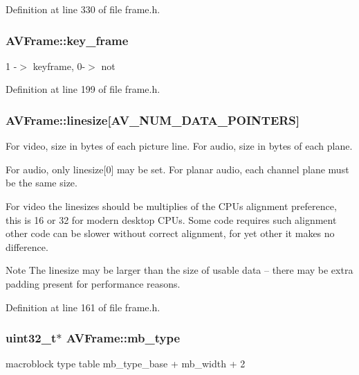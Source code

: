 Definition at line 330 of file frame.\+h.

\subsubsection[{\texorpdfstring{key\+\_\+frame}{key_frame}}]{ A\+V\+Frame\+::key\+\_\+frame}\hypertarget{struct_a_v_frame_a3649a81e8414a193d685a6eee06ce902}{}\label{struct_a_v_frame_a3649a81e8414a193d685a6eee06ce902}
1 -\/$>$ keyframe, 0-\/$>$ not 

Definition at line 199 of file frame.\+h.

\subsubsection[{\texorpdfstring{linesize}{linesize}}]{ A\+V\+Frame\+::linesize\mbox{[}{\bf A\+V\+\_\+\+N\+U\+M\+\_\+\+D\+A\+T\+A\+\_\+\+P\+O\+I\+N\+T\+E\+RS}\mbox{]}}\hypertarget{struct_a_v_frame_aa52bfc6605f6a3059a0c3226cc0f6567}{}\label{struct_a_v_frame_aa52bfc6605f6a3059a0c3226cc0f6567}
For video, size in bytes of each picture line. For audio, size in bytes of each plane.

For audio, only linesize\mbox{[}0\mbox{]} may be set. For planar audio, each channel plane must be the same size.

For video the linesizes should be multiplies of the C\+P\+Us alignment preference, this is 16 or 32 for modern desktop C\+P\+Us. Some code requires such alignment other code can be slower without correct alignment, for yet other it makes no difference.

\begin{DoxyNote}{Note}
The linesize may be larger than the size of usable data -- there may be extra padding present for performance reasons. 
\end{DoxyNote}


Definition at line 161 of file frame.\+h.

\subsubsection[{\texorpdfstring{mb\+\_\+type}{mb_type}}]{ {\bf uint32\+\_\+t}$\ast$ A\+V\+Frame\+::mb\+\_\+type}\hypertarget{struct_a_v_frame_a1e86aef37e3ef464d2ddb070fa2a3bee}{}\label{struct_a_v_frame_a1e86aef37e3ef464d2ddb070fa2a3bee}
macroblock type table mb\+\_\+type\+\_\+base + mb\+\_\+width + 2 

